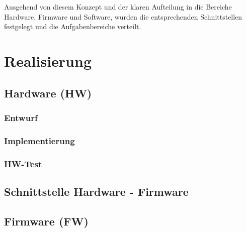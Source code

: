 \documentclass[a4paper, portrait, 12pt]{scrartcl} %
\begin{document}
Ausgehend von diesem Konzept und der klaren Aufteilung in die Bereiche Hardware, Firmware und Software, wurden die entsprechenden Schnittstellen festgelegt und die Aufgabenbereiche verteilt.

\pagebreak

\section{Realisierung}

\subsection{Hardware (HW)}
\subsubsection{Entwurf}
\subsubsection{Implementierung}
\subsubsection{HW-Test}

\pagebreak

\subsection{Schnittstelle Hardware - Firmware}

\pagebreak


\subsection{Firmware (FW)}
\end{document}

